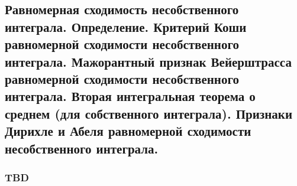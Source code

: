\subsection{Равномерная сходимость несобственного интеграла. Определение. Критерий Коши равномерной сходимости несобственного интеграла. Мажорантный признак Вейерштрасса равномерной сходимости несобственного интеграла. Вторая интегральная теорема о среднем (для собственного интеграла). Признаки Дирихле и Абеля равномерной сходимости несобственного интеграла.}

\subsubsection{TBD}